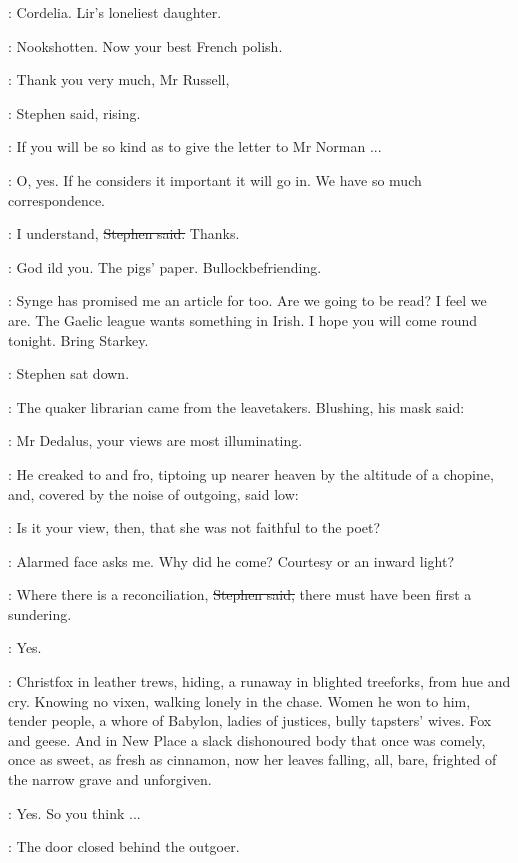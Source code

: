 \StephenInt:
Cordelia.
Lir's loneliest daughter.

\StephenInt:
Nookshotten.
Now your best French polish.

\Stephen:
Thank you very much,
Mr Russell,

:
Stephen said, rising.

\Stephen:
If you will be so kind as to give the letter to Mr Norman ...

\AErussell:
O, yes.
If he considers it important
it will go in.
We have so much correspondence.

\Stephen:
I understand,
\sout{Stephen said.}
Thanks.

\StephenInt:
God ild you.
The pigs' paper.
Bullockbefriending.

\AErussell:
Synge has promised me an article for  too.
Are we going to be read?
I feel we are.
The Gaelic league wants something in Irish.
I hope you will come round tonight.
Bring Starkey.

:
Stephen sat down.

:
The quaker librarian came from the leavetakers.
Blushing,
his mask said:

\librarian:
Mr Dedalus,
your views are most illuminating.

:
He creaked to and fro,
tiptoing up nearer heaven by the altitude of a chopine,
and,
covered by the noise of outgoing,
said low:

\librarian:
Is it your view,
then,
that she was not faithful to the poet?

\StephenInt:
Alarmed face asks me.
Why did he come?
Courtesy or an inward light?

\Stephen:
Where there is a reconciliation,
\sout{Stephen said,}
there must have been first a sundering.

\librarian:
Yes.

\StephenInt:
Christfox in leather trews,
hiding,
a runaway in blighted treeforks,
from hue and cry.
Knowing no vixen,
walking lonely in the chase.
Women he won to him,
tender people,
a whore of Babylon,
ladies of justices,
bully tapsters' wives.
Fox and geese.
And in New Place
a slack dishonoured body that once was comely,
once as sweet,
as fresh as cinnamon,
now her leaves falling,
all, bare,
frighted of the narrow grave
and unforgiven.

\librarian:
Yes.
So you think ...

:
The door closed behind the outgoer.

